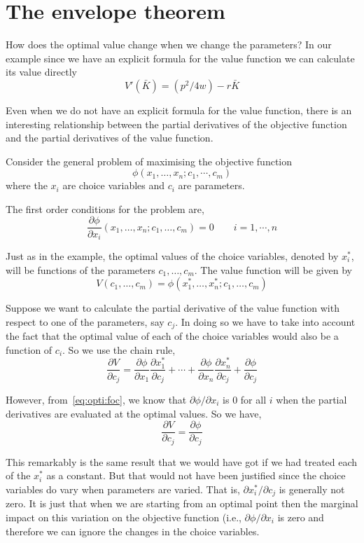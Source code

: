 \documentclass[12pt,reqno,openany]{amsbook}
\theoremstyle{plain}
\theoremstyle{definition}
\begin{document}
\section{The envelope theorem}
How does the optimal value change when we change the parameters? In
our example since we have an explicit formula for the value function
we can calculate its value directly
\[V'(\bar K) =(p^2/4w)-r\bar K\]

Even when we do not have an explicit formula for the value function,
there is an interesting relationship between the partial derivatives
of the objective function and the partial derivatives of the value
function.

Consider the general problem of maximising the objective function
\[\phi(x_1,\ldots,x_n;c_1,\cdots,c_m)\]
where the $x_i$ are choice variables and $c_i$ are parameters.

The first order conditions for the problem are,
\begin{equation}\label{eq:opti:foc}
\frac{\partial \phi}{\partial
  x_i}(x_1,\ldots,x_n;c_1,\ldots,c_m)=0\qquad i=1,\cdots,n
\end{equation}

Just as in the example, the optimal values of the choice variables,
denoted by $x_i^*$, will be functions of the parameters
$c_1,\ldots,c_m$. The value function will be given by
\[V(c_1,\ldots,c_m)=\phi(x_1^*,\ldots,x_n^*;c_1,\ldots,c_m)\]

Suppose we want to calculate the partial derivative of the value
function with respect to one of the parameters, say $c_j$. In doing so
we have to take into account the fact that the optimal value of each
of the choice variables would also be a function of $c_i$. So we use the
chain rule,
\[\frac{\partial V}{\partial c_j}=
\frac{\partial \phi}{\partial x_1}\frac{\partial x_1^*}{\partial c_j}
+\cdots
+\frac{\partial \phi}{\partial x_n}\frac{\partial x_n^*}{\partial c_j}
+\frac{\partial \phi}{\partial c_j}
\]

However, from~\eqref{eq:opti:foc}, we know that $\partial
\phi/\partial x_i$ is $0$ for all $i$ when the partial derivatives are
evaluated at the optimal values. So we have,
\begin{equation}\label{eq:opti:envelope}
\frac{\partial V}{\partial c_j}=\frac{\partial \phi}{\partial c_j}
\end{equation}

This remarkably is the same result that we would have got if we had
treated each of the $x_i^*$ as a constant. But that would not have
been justified since the choice variables do vary when parameters are
varied. That is, $\partial x_i^*/\partial c_j$ is generally not zero.
It is just that when we are starting from an optimal point then the
marginal impact on this variation on the objective function (i.e.,
$\partial \phi/\partial x_i$ is zero and therefore we can ignore the
changes in the choice variables.
\end{document}
